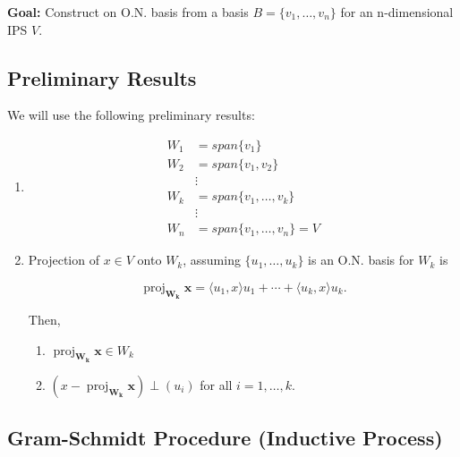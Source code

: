 \documentclass[12pt]{article}
\DeclareMathOperator{\proj}{proj}
\newcommand{\vct}{\mathbf}
\newcommand{\vctproj}[2][]{\proj_{\vct{#1}}\vct{#2}}
\theoremstyle{definition}
\begin{document}
\noindent \textbf{Goal:} Construct on O.N. basis from a basis $B = \{v_1, \ldots, v_n\}$
for an n-dimensional IPS $V$.

\subsection{Preliminary Results}

We will use the following preliminary results:

\begin{enumerate}[label = (\arabic*)]
\item\begin{align*}
W_1 &= span\{v_1\} \\
W_2 &= span\{v_1, v_2\} \\
&\vdots \\
W_k &= span\{v_1, \ldots, v_k \} \\
&\vdots \\
W_n &= span\{v_1, \ldots, v_n\} = V
\end{align*}

\item Projection of $x \in V$ onto $W_k$, assuming $\{u_1, \ldots, u_k\}$ is an O.N.
basis for $W_k$ is

\[ \vctproj[W_k]{x} = \langle u_1, x \rangle u_1 + \cdots + \langle u_k, x \rangle u_k. \]

Then,
\begin{enumerate}[label = (\arabic*)]
\item $\vctproj[W_k]{x} \in W_k$
\item $(x - \vctproj[W_k]{x}) \perp (u_i)$ for all $i = 1, \ldots, k$.
\end{enumerate}

\end{enumerate}

\subsection{Gram-Schmidt Procedure (Inductive Process)}
\end{document}
